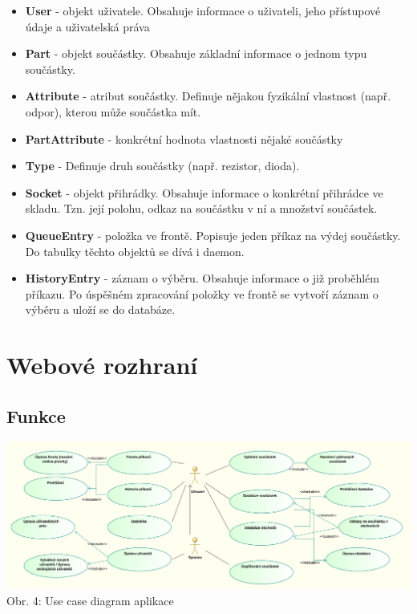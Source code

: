\documentclass[12pt, a4paper, oneside]{article}
\begin{document}
\begin{itemize}
\item \textbf{User} - objekt uživatele. Obsahuje informace o uživateli, jeho přístupové údaje a uživatelská práva
\item \textbf{Part} - objekt součástky. Obsahuje základní informace o jednom typu součástky.
\item \textbf{Attribute} - atribut součástky. Definuje nějakou fyzikální vlastnost (např. odpor), kterou může součástka mít.
\item \textbf{PartAttribute} - konkrétní hodnota vlastnosti nějaké součástky
\item \textbf{Type} - Definuje druh součástky (např. rezistor, dioda).
\item \textbf{Socket} - objekt přihrádky. Obsahuje informace o konkrétní přihrádce ve skladu. Tzn. její polohu, odkaz na součástku v ní a množství součástek.
\item \textbf{QueueEntry} - položka ve frontě. Popisuje jeden příkaz na výdej součástky. Do tabulky těchto objektů se dívá i daemon.
\item \textbf{HistoryEntry} - záznam o výběru. Obsahuje informace o již proběhlém příkazu. Po úspěšném zpracování položky ve frontě se vytvoří záznam o výběru a uloží se do databáze.
\end{itemize}


\section{Webové rozhraní}  %

\subsection{Funkce}

\begin{minipage}{\textwidth}
\begin{center}
\hspace*{-2cm}
\includegraphics[scale=0.69]{img/use_case_uml.png}
\\
\caption{Obr. 4: Use case diagram aplikace}
\end{center}
\end{minipage}
\vspace{4mm}
\end{document}
